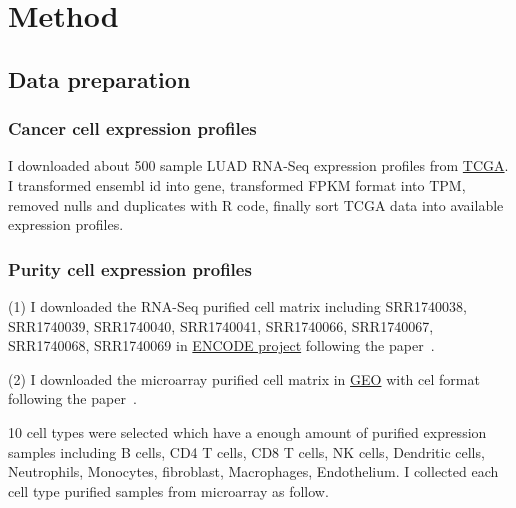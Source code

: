 \documentclass{article}
\begin{document}
\section{Method}
\subsection{Data preparation}

\subsubsection{Cancer cell expression profiles}
I downloaded about 500 sample LUAD RNA-Seq expression profiles from \href{https://portal.gdc.cancer.gov/}{TCGA}.
I transformed ensembl id into gene, transformed FPKM format into TPM, removed nulls and duplicates with R code, finally sort TCGA data into available expression profiles.

\subsubsection{Purity cell expression profiles}

(1) I downloaded the RNA-Seq purified cell matrix including SRR1740038, SRR1740039, SRR1740040, SRR1740041, SRR1740066, SRR1740067, SRR1740068, SRR1740069 in \href{https://www.encodeproject.org/}{ENCODE project} following the paper~\cite{Aran2017xCell}.

(2) I downloaded the microarray purified cell matrix in \href{https://www.ncbi.nlm.nih.gov/geo/}{GEO} with cel format following the paper~\cite{Etienne2016Estimating}.

10 cell types were selected  which have a enough amount of purified expression samples including B cells, CD4 T cells, CD8 T cells, NK cells, Dendritic cells, Neutrophils, Monocytes, fibroblast, Macrophages, Endothelium. I collected each cell type purified samples from microarray as follow.
\end{document}
